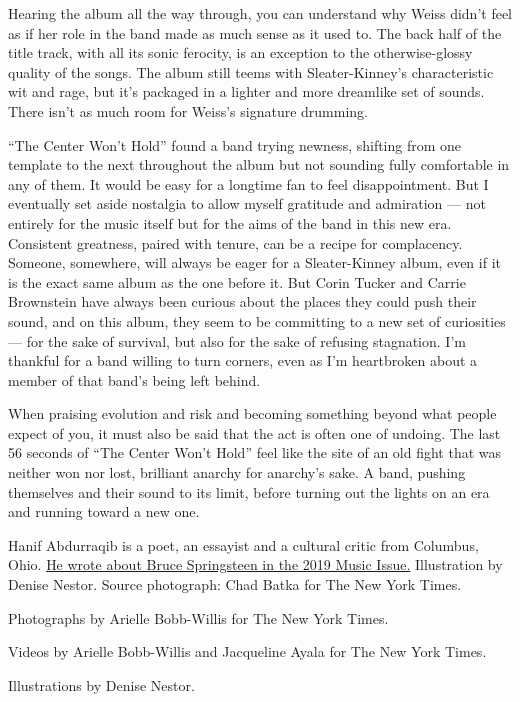 Hearing the album all the way through, you can understand why Weiss
didn't feel as if her role in the band made as much sense as it used to.
The back half of the title track, with all its sonic ferocity, is an
exception to the otherwise-glossy quality of the songs. The album still
teems with Sleater-Kinney's characteristic wit and rage, but it's
packaged in a lighter and more dreamlike set of sounds. There isn't as
much room for Weiss's signature drumming.

``The Center Won't Hold'' found a band trying newness, shifting from one
template to the next throughout the album but not sounding fully
comfortable in any of them. It would be easy for a longtime fan to feel
disappointment. But I eventually set aside nostalgia to allow myself
gratitude and admiration --- not entirely for the music itself but for
the aims of the band in this new era. Consistent greatness, paired with
tenure, can be a recipe for complacency. Someone, somewhere, will always
be eager for a Sleater-Kinney album, even if it is the exact same album
as the one before it. But Corin Tucker and Carrie Brownstein have always
been curious about the places they could push their sound, and on this
album, they seem to be committing to a new set of curiosities --- for
the sake of survival, but also for the sake of refusing stagnation. I'm
thankful for a band willing to turn corners, even as I'm heartbroken
about a member of that band's being left behind.

When praising evolution and risk and becoming something beyond what
people expect of you, it must also be said that the act is often one of
undoing. The last 56 seconds of ``The Center Won't Hold'' feel like the
site of an old fight that was neither won nor lost, brilliant anarchy
for anarchy's sake. A band, pushing themselves and their sound to its
limit, before turning out the lights on an era and running toward a new
one.

Hanif Abdurraqib is a poet, an essayist and a cultural critic from
Columbus, Ohio.
\href{https://www.nytimes3xbfgragh.onion/interactive/2019/03/07/magazine/top-songs.html\#/bruce-springsteen}{He
wrote about Bruce Springsteen in the 2019 Music Issue.} Illustration by
Denise Nestor. Source photograph: Chad Batka for The New York Times.

Photographs by Arielle Bobb-Willis for The New York Times.

Videos by Arielle Bobb-Willis and Jacqueline Ayala for The New York
Times.

Illustrations by Denise Nestor.

